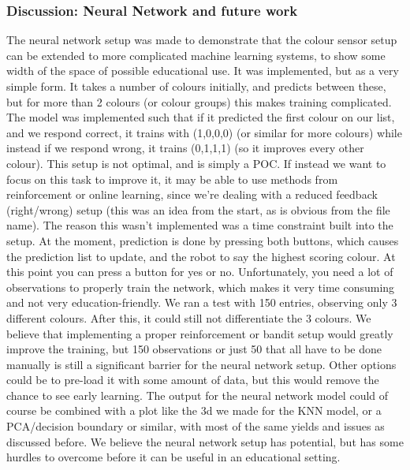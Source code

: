 \documentclass[11pt, a4paper]{article}
\begin{document}
\subsubsection{Discussion: Neural Network and future work}
The neural network setup was made to demonstrate that the colour sensor setup can be extended to more complicated machine learning systems, to show some width of the space of possible educational use. It was implemented, but as a very simple form. It takes a number of colours initially, and predicts between these, but for more than 2 colours (or colour groups) this makes training complicated. The model was implemented such that if it predicted the first colour on our list, and we respond correct, it trains with (1,0,0,0) (or similar for more colours) while instead if we respond wrong, it trains (0,1,1,1) (so it improves every other colour). This setup is not optimal, and is simply a POC. If instead we want to focus on this task to improve it, it may be able to use methods from reinforcement or online learning, since we're dealing with a reduced feedback (right/wrong) setup (this was an idea from the start, as is obvious from the file name). The reason this wasn't implemented was a time constraint built into the setup. At the moment, prediction is done by pressing both buttons, which causes the prediction list to update, and the robot to say the highest scoring colour. At this point you can press a button for yes or no. Unfortunately, you need a lot of observations to properly train the network, which makes it very time consuming and not very education-friendly. We ran a test with 150 entries, observing only 3 different colours. After this, it could still not differentiate the 3 colours. We believe that implementing a proper reinforcement or bandit setup would greatly improve the training, but 150 observations or just 50 that all have to be done manually is still a significant barrier for the neural network setup. Other options could be to pre-load it with some amount of data, but this would remove the chance to see early learning. The output for the neural network model could of course be combined with a plot like the 3d we made for the KNN model, or a PCA/decision boundary or similar, with most of the same yields and issues as discussed before. We believe the neural network setup has potential, but has some hurdles to overcome before it can be useful in an educational setting.

\pagebreak
\end{document}
